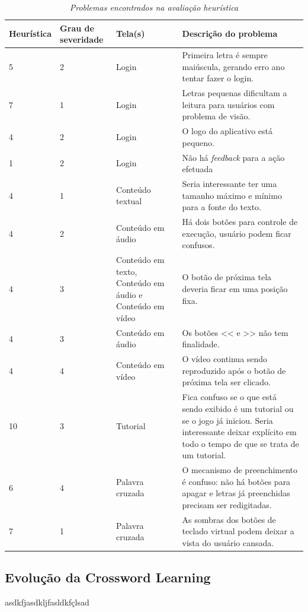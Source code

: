 \begin{table}[h]
\centering
\caption{\textit{Problemas encontrados na avaliação heurística}}
\centering
\footnotesize
\begin{tabular}{p{4cm} p{4cm} p{4cm} p{4cm}}
\toprule
\textbf{Heurística} & \textbf{Grau de severidade} & \textbf{Tela(s)} & \textbf{Descrição do problema}       
\\ \midrule
5
& 
2
&
Login
&
Primeira letra é sempre maiúscula, gerando erro ano tentar fazer o login.
\\ \midrule
7
& 
1
&
Login
&
Letras pequenas dificultam a leitura para usuários com problema de visão.
\\ \midrule
4
& 
2
&
Login
&
O logo do aplicativo está pequeno.
\\ \midrule

1
& 
2
&
Login
&
Não há \textit{feedback} para a ação efetuada
\\ \midrule
4
& 
1
&
Conteúdo textual
&
Seria interessante ter uma tamanho máximo e mínimo para a fonte do texto.
\\ \midrule
4
& 
2
&
Conteúdo em áudio
&
Há dois botões para controle de execução, usuário podem ficar confusos.
\\ \midrule
4
& 
3
&
Conteúdo em texto, Conteúdo em áudio e Conteúdo em vídeo
&
O botão de próxima tela deveria ficar em uma posição fixa.
\\ \midrule
4
& 
3
&
Conteúdo em áudio
&
Os botões << e >> não tem finalidade.
\\ \midrule
4
& 
4
&
Conteúdo em vídeo
&
O vídeo continua sendo reproduzido após o botão de próxima tela ser clicado.
\\ \midrule
10
& 
3
&
Tutorial
&
Fica confuso se o que está sendo exibido é um tutorial ou se o jogo já iniciou. Seria interessante deixar explícito em todo o tempo de que se trata de um tutorial.
\\ \midrule
6
& 
4
&
Palavra cruzada
&
O mecanismo de preenchimento é confuso: não há botões para apagar e letras já preenchidas precisam ser redigitadas.
\\ \midrule
7
& 
1
&
Palavra cruzada
&
As sombras dos botões de teclado virtual podem deixar a vista do usuário cansada.
\\ \bottomrule

\end{tabular}
\label{tab:avaliacaonielsen}
\end{table}

\subsection{Evolução da Crossword Learning}
asdkfjasdkljfasldkfçlsad

